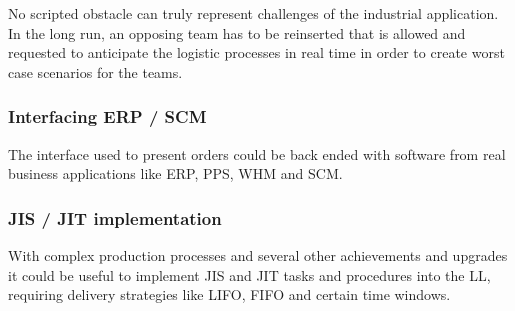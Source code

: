 \documentclass[12pt,twoside]{article}
\begin{document}
No scripted obstacle can truly represent challenges of the industrial
application. In the long run, an opposing team has to be reinserted
that is allowed and requested to anticipate the logistic processes in
real time in order to create worst case scenarios for the teams.

\subsubsection{Interfacing ERP / SCM}

The interface used to present orders could be back ended with software
from real business applications like ERP, PPS, WHM and SCM.

\subsubsection{JIS / JIT implementation}

With complex production processes and several other achievements and
upgrades it could be useful to implement JIS and JIT tasks and
procedures into the LL, requiring delivery strategies like LIFO, FIFO
and certain time windows.



 
\end{document}
